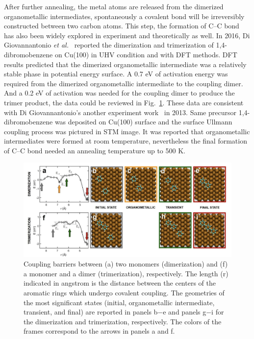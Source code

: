\documentclass[%
 reprint,
 amsmath,amssymb,
 aps,
prb,
]{revtex4-1}
\begin{document}
After further annealing, the metal atoms are released from the dimerized organometallic intermediates, spontaneously a covalent bond will be irreversibly constructed between two carbon atoms. This step, the formation of C--C bond has also been widely explored in experiment and theoretically as well. In 2016, Di Giovannantonio \textit{et al.}~\cite{jacs2016} reported the dimerization and trimerization of 1,4-dibromobenzene on Cu(100) in UHV condition and with DFT methods. DFT results predicted that the dimerized organometallic intermediate was a relatively stable phase in potential energy surface. A 0.7 eV of activation energy was required from the dimerized organometallic intermediate to the coupling dimer. And a 0.2 eV of activation was needed for the coupling dimer to produce the trimer product, the data could be reviewed in Fig.~\ref{fig:dimer}. These data are consistent with Di Giovannantonio's another experiment work~\cite{acsnano2013} in 2013. Same precursor 1,4-dibromobenzene was deposited on Cu(100) surface and the surface Ullmann coupling process was pictured in STM image. It was reported that organometallic intermediates were formed at room temperature, nevertheless the final formation of C--C bond needed an annealing temperature up to 500 K.
%
\begin{figure}[ht]
\centering
\includegraphics[width=1.0\textwidth]{Fig/Dimer_trimer.png}
\caption{Coupling barriers between (a) two monomers (dimerization) and (f) a monomer and a dimer (trimerization), respectively. The length (r) indicated in angstrom is the distance between the centers of the aromatic rings which undergo covalent coupling. The geometries of the most significant states (initial, organometallic intermediate, transient, and final) are reported in panels b−e and panels g−i for the dimerization and trimerization, respectively. The colors of the frames correspond to the arrows in panels a and f.}
\label{fig:dimer}
\end{figure}
%
\end{document}
